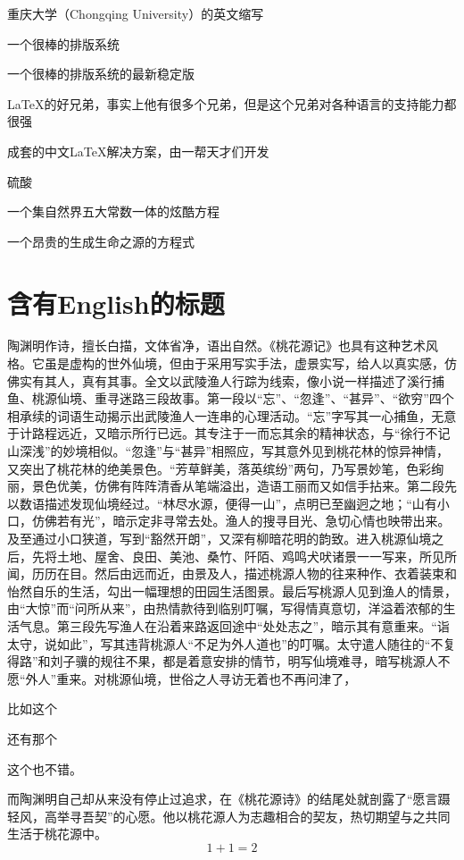\documentclass[type=bachelor]{cquthesis}
\begin{document}
	\frontmatter
	
	
	\makecover
	\cleardoublepage
	\tableofcontents
	\listofequations
\begin{denotation}[10mm][40mm]
	\item[CQU] 重庆大学（Chongqing University）的英文缩写
	\item[\LaTeX] 一个很棒的排版系统
	\item[\LaTeXe] 一个很棒的排版系统的最新稳定版
	\item[XeTeX] \LaTeX{}的好兄弟，事实上他有很多个兄弟，但是这个兄弟对各种语言的支持能力都很强
	\item[CTeX宏集] 成套的中文\LaTeX{}解决方案，由一帮天才们开发
	\item[\ce{H2SO4}] 硫酸
	\item[$ e^{\pi{}i}+1=0$] 一个集自然界五大常数一体的炫酷方程
	\item[\ce{2H2 + O2 -> 2H2O}] 一个昂贵的生成生命之源的方程式
\end{denotation}
	\mainmatter
	\chapter{含有English的标题}
	陶渊明作诗，擅长白描，文体省净，语出自然。《桃花源记》也具有这种艺术风格。它虽是虚构的世外仙境，但由于采用写实手法，虚景实写，给人以真实感，仿佛实有其人，真有其事。全文以武陵渔人行踪为线索，像小说一样描述了溪行捕鱼、桃源仙境、重寻迷路三段故事。第一段以“忘”、“忽逢”、“甚异”、“欲穷”四个相承续的词语生动揭示出武陵渔人一连串的心理活动。“忘”字写其一心捕鱼，无意于计路程远近，又暗示所行已远。其专注于一而忘其余的精神状态，与“徐行不记山深浅”的妙境相似。“忽逢”与“甚异”相照应，写其意外见到桃花林的惊异神情，又突出了桃花林的绝美景色。“芳草鲜美，落英缤纷”两句，乃写景妙笔，色彩绚丽，景色优美，仿佛有阵阵清香从笔端溢出，造语工丽而又如信手拈来。第二段先以数语描述发现仙境经过。“林尽水源，便得一山”，点明已至幽迥之地；“山有小口，仿佛若有光”，暗示定非寻常去处。渔人的搜寻目光、急切心情也映带出来。及至通过小口狭道，写到“豁然开朗”，又深有柳暗花明的韵致。进入桃源仙境之后，先将土地、屋舍、良田、美池、桑竹、阡陌、鸡鸣犬吠诸景一一写来，所见所闻，历历在目。然后由远而近，由景及人，描述桃源人物的往来种作、衣着装束和怡然自乐的生活，勾出一幅理想的田园生活图景。最后写桃源人见到渔人的情景，由“大惊”而“问所从来”，由热情款待到临别叮嘱，写得情真意切，洋溢着浓郁的生活气息。第三段先写渔人在沿着来路返回途中“处处志之”，暗示其有意重来。“诣太守，说如此”，写其违背桃源人“不足为外人道也”的叮嘱。太守遣人随往的“不复得路”和刘子骥的规往不果，都是着意安排的情节，明写仙境难寻，暗写桃源人不愿“外人”重来。对桃源仙境，世俗之人寻访无着也不再问津了，\begin{enumerate*}
		\item 比如这个
		\item 还有那个
		\item 这个也不错。
	\end{enumerate*}
	而陶渊明自己却从来没有停止过追求，在《桃花源诗》的结尾处就剖露了“愿言蹑轻风，高举寻吾契”的心愿。他以桃花源人为志趣相合的契友，热切期望与之共同生活于桃花源中。
	\begin{equation}
	1 + 1 = 2
	\end{equation}
	\label{eq:bc}
	
\end{document}
